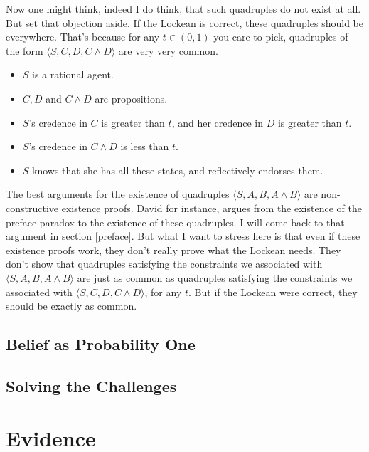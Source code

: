 \documentclass[11pt,]{book}
\providecommand{\tightlist}{%
  \setlength{\itemsep}{0pt}\setlength{\parskip}{0pt}}
\begin{document}
Now one might think, indeed I do think, that such quadruples do not exist at all. But set that objection aside. If the Lockean is correct, these quadruples should be everywhere. That's because for any \(t \in (0, 1)\) you care to pick, quadruples of the form \(\langle S, C, D, C \wedge D \rangle\) are very very common.

\begin{itemize}
\tightlist
\item
  \(S\) is a rational agent.
\item
  \(C, D\) and \(C \wedge D\) are propositions.
\item
  \(S\)'s credence in \(C\) is greater than \(t\), and her credence in \(D\) is greater than \(t\).
\item
  \(S\)'s credence in \(C \wedge D\) is less than \(t\).
\item
  \(S\) knows that she has all these states, and reflectively endorses them.
\end{itemize}

The best arguments for the existence of quadruples \(\langle S, A, B, A \wedge B \rangle\) are non-constructive existence proofs. David \citet{Christensen2005} for instance, argues from the existence of the preface paradox to the existence of these quadruples. I will come back to that argument in section \ref{preface}. But what I want to stress here is that even if these existence proofs work, they don't really prove what the Lockean needs. They don't show that quadruples satisfying the constraints we associated with \(\langle S, A, B, A \wedge B \rangle\) are just as common as quadruples satisfying the constraints we associated with \(\langle S, C, D, C \wedge D \rangle\), for any \(t\). But if the Lockean were correct, they should be exactly as common.

\hypertarget{probone}{%
\section{Belief as Probability One}\label{probone}}

\hypertarget{solving}{%
\section{Solving the Challenges}\label{solving}}

\hypertarget{evidence}{%
\chapter{Evidence}\label{evidence}}
\end{document}
